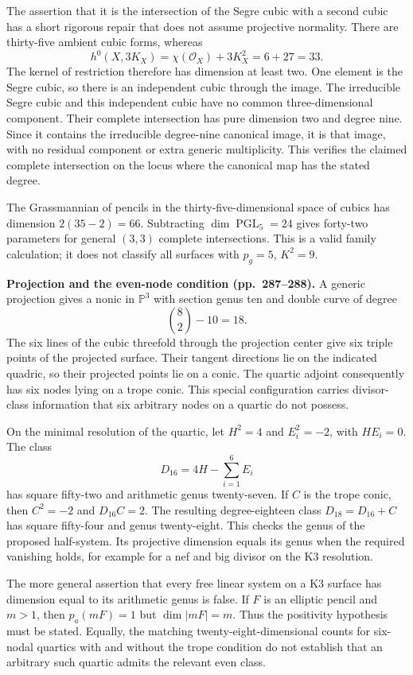 The assertion that it is the intersection of the Segre cubic with a second cubic has a short rigorous repair that does not assume projective normality. There are thirty-five ambient cubic forms, whereas
\[
h^0(X,3K_X)=\chi(\mathcal O_X)+3K_X^2=6+27=33.
\]
The kernel of restriction therefore has dimension at least two. One element is the Segre cubic, so there is an independent cubic through the image. The irreducible Segre cubic and this independent cubic have no common three-dimensional component. Their complete intersection has pure dimension two and degree nine. Since it contains the irreducible degree-nine canonical image, it is that image, with no residual component or extra generic multiplicity. This verifies the claimed complete intersection on the locus where the canonical map has the stated degree.

The Grassmannian of pencils in the thirty-five-dimensional space of cubics has dimension \(2(35-2)=66\). Subtracting \(\dim\operatorname{PGL}_5=24\) gives forty-two parameters for general \((3,3)\) complete intersections. This is a valid family calculation; it does not classify all surfaces with \(p_g=5\), \(K^2=9\).

\textbf{Projection and the even-node condition (pp.~287--288).}
A generic projection gives a nonic in \(\mathbb P^3\) with section genus ten and double curve of degree
\[
\binom{8}{2}-10=18.
\]
The six lines of the cubic threefold through the projection center give six triple points of the projected surface. Their tangent directions lie on the indicated quadric, so their projected points lie on a conic. The quartic adjoint consequently has six nodes lying on a trope conic. This special configuration carries divisor-class information that six arbitrary nodes on a quartic do not possess.

On the minimal resolution of the quartic, let \(H^2=4\) and \(E_i^2=-2\), with \(HE_i=0\). The class
\[
D_{16}=4H-\sum_{i=1}^{6}E_i
\]
has square fifty-two and arithmetic genus twenty-seven. If \(C\) is the trope conic, then \(C^2=-2\) and \(D_{16}C=2\). The resulting degree-eighteen class \(D_{18}=D_{16}+C\) has square fifty-four and genus twenty-eight. This checks the genus of the proposed half-system. Its projective dimension equals its genus when the required vanishing holds, for example for a nef and big divisor on the K3 resolution.

The more general assertion that every free linear system on a K3 surface has dimension equal to its arithmetic genus is false. If \(F\) is an elliptic pencil and \(m>1\), then \(p_a(mF)=1\) but \(\dim|mF|=m\). Thus the positivity hypothesis must be stated. Equally, the matching twenty-eight-dimensional counts for six-nodal quartics with and without the trope condition do not establish that an arbitrary such quartic admits the relevant even class.

